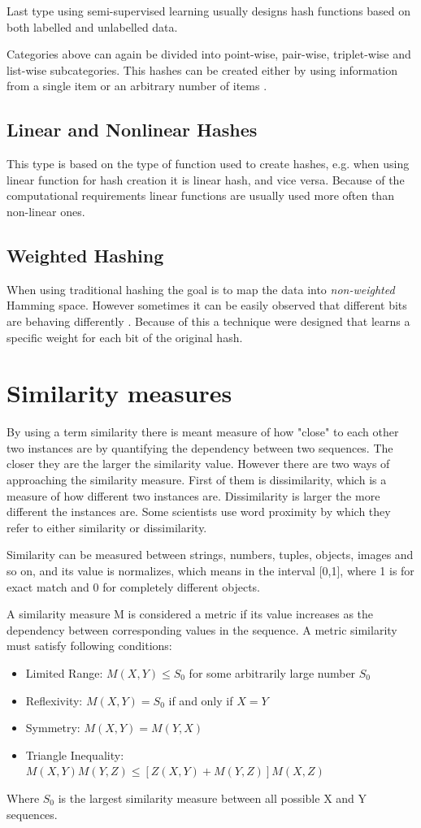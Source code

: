 Last type using semi-supervised learning usually designs hash functions based on both labelled and unlabelled data.

Categories above can again be divided into point-wise, pair-wise, triplet-wise and list-wise subcategories. This hashes can be created either by using information from a single item or an arbitrary number of items \cite{learnHash}.

\subsection{Linear and Nonlinear Hashes}
This type is based on the type of function used to create hashes, e.g. when using linear function for hash creation it is linear hash, and vice versa. Because of the computational requirements linear functions are usually used more often than non-linear ones. \cite{learnHash}

\subsection{Weighted Hashing}
When using traditional hashing the goal is to map the data into \textit{non-weighted} Hamming space. However sometimes it can be easily observed that different bits are behaving differently \cite{learnHash}. Because of this a technique were designed that learns a specific weight for each bit of the original hash.

\section{Similarity measures}\label{similMeasures}
By using a term similarity there is meant measure of how "close" to each other two instances are by quantifying the dependency between two sequences. The closer they are the larger the similarity value. However there are two ways of approaching the similarity measure. First of them is dissimilarity, which is a measure of how different two instances are. Dissimilarity is larger the more different the instances are. Some scientists use word proximity by which they refer to either similarity or dissimilarity.

Similarity can be measured between strings, numbers, tuples, objects, images and so on, and its value is normalizes, which means in the interval [0,1], where 1 is for exact match and 0 for completely different objects. \cite{simDissim}

A similarity measure M is considered a metric if its value increases as the dependency between corresponding values in the sequence. A metric similarity must satisfy following conditions:
\begin{itemize}
\item Limited Range: $M(X,Y) \leq S_0$ for some arbitrarily large number $S_0$
\item Reflexivity: $M(X,Y) = S_0$ if and only if $X=Y$
\item Symmetry: $M(X,Y)=M(Y,X)$
\item Triangle Inequality: $M(X,Y)M(Y,Z)\leq [Z(X,Y)+M(Y,Z)]M(X,Z)$
\end{itemize}
Where $S_0$ is the largest similarity measure between all possible X and Y sequences.

